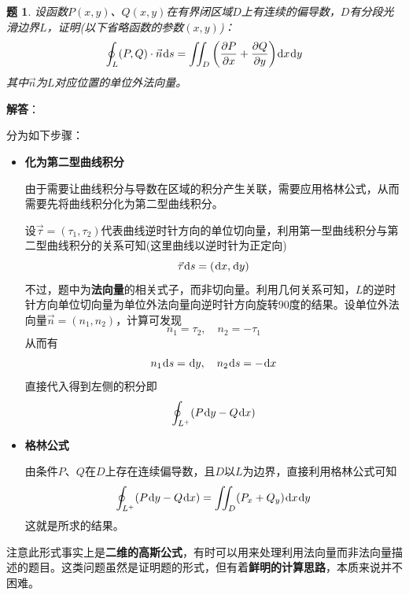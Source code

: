 \documentclass[a4paper,UTF8,fontset=windows,AutoFakeBold]{ctexart}
\newcommand*{\dr}{\hspace{0.07em}\mathrm{d}}
\newcommand*{\nv}{\vec{n}}
\newcommand*{\note}{\noindent *}
\theoremstyle{ex}
\newtheorem{exercise}{题}
\newcommand{\sol}[1]{{\vspace{5pt}\kaishu\noindent\textbf{解答}：\vspace{-3pt}
\begin{compactitem}
    \item[] #1
\end{compactitem}
}}
\begin{document}
\begin{framed}
\begin{exercise}\label{2d gauss}
    设函数$P(x,y)$、$Q(x,y)$在有界闭区域$D$上有连续的偏导数，$D$有分段光滑边界$L$，证明(以下省略函数的参数$(x,y)$)：
    $$\oint_L(P,Q)\cdot\nv\dr s=\iint_D\bigg(\frac{\partial P}{\partial x}+\frac{\partial Q}{\partial y}\bigg)\dr x\dr y$$
    其中$\nv$为$L$对应位置的单位外法向量。
\end{exercise}
    \sol{
        分为如下步骤：
        \begin{itemize}
            \item \textbf{化为第二型曲线积分}
            
            由于需要让曲线积分与导数在区域的积分产生关联，需要应用格林公式，从而需要先将曲线积分化为第二型曲线积分。

            设$\vec\tau=(\tau_1,\tau_2)$代表曲线逆时针方向的单位切向量，利用第一型曲线积分与第二型曲线积分的关系可知(这里曲线以逆时针为正定向)
            $$\vec\tau\dr s=(\dr x,\dr y)$$
            不过，题中为\textbf{法向量}的相关式子，而非切向量。利用几何关系可知，$L$的逆时针方向单位切向量为单位外法向量向逆时针方向旋转90度的结果。设单位外法向量$\nv=(n_1,n_2)$，计算可发现
            $$n_1=\tau_2,\quad n_2=-\tau_1$$
            从而有
            $$n_1\dr s=\dr y,\quad n_2\dr s=-\dr x$$
            直接代入得到左侧的积分即
            $$\oint_{L^+}(P\dr y-Q\dr x)$$
            
            \item \textbf{格林公式}
            
            由条件$P$、$Q$在$D$上存在连续偏导数，且$D$以$L$为边界，直接利用格林公式可知
            $$\oint_{L^+}(P\dr y-Q\dr x)=\iint_D(P_x+Q_y)\dr x\dr y$$
            这就是所求的结果。
        \end{itemize}
    }
\end{framed}

\note 注意此形式事实上是\textbf{二维的高斯公式}，有时可以用来处理利用法向量而非法向量描述的题目。这类问题虽然是证明题的形式，但有着\textbf{鲜明的计算思路}，本质来说并不困难。
\end{document}
